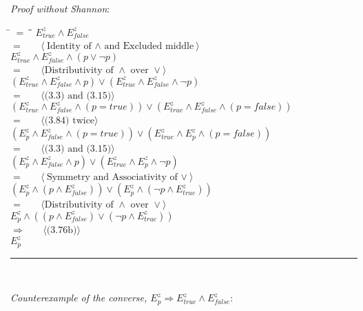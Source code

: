 \documentclass[12pt, fleqn, leqno]{article}
\newcommand{\lgap}{2pt}                             %
\newcommand{\mymathindent}{24pt}                    %
\newcommand{\impl}{\ensuremath{\Rightarrow}}        %
\newcommand{\myqed}{\rule[-.23ex]{1.2ex}{2.0ex}}
\newcommand{\myqedtab}{\hspace{384pt}}              %
\newcommand{\Gll} {\langle}                         %
\newcommand{\Ggg} {\rangle}                         %
\newcommand{\Hint}[1]     {\ \ \ $\Gll              \mbox{#1} \Ggg$ }   %
\begin{document}
\emph{Proof without Shannon}:
\begin{tabbing}
\hspace{\mymathindent} \= $= \;$ \= \myqedtab \= \kill
	\> \>  $E^{z}_{true}\land E^{z}_{false}$\\
	\> $=$  \>  \Hint{Identity of $\land$ and Excluded middle}\\[\lgap]
	\> \>   $E^{z}_{true}\land E^{z}_{false}\land(p\lor\lnot p)$\\
	\> $=$  \>  \Hint{Distributivity of $\land$ over $\lor$}\\[\lgap]
	\> \>   $(E^{z}_{true}\land E^{z}_{false}\land p)\lor(E^{z}_{true}\land E^{z}_{false}\land\lnot p)$\\
	\> $=$  \>  \Hint{(3.3) and (3.15)}\\[\lgap]
	\> \>   $(E^{z}_{true}\land E^{z}_{false}\land (p=true))\lor(E^{z}_{true}\land E^{z}_{false}\land (p=false))$\\
	\> $=$  \>  \Hint{(3.84) twice}\\[\lgap]
	\> \>   $(E^{z}_{p}\land E^{z}_{false}\land (p=true))\lor(E^{z}_{true}\land E^{z}_{p}\land (p=false))$\\
	\> $=$  \>  \Hint{(3.3) and (3.15)}\\[\lgap]
	\> \>   $(E^{z}_{p}\land E^{z}_{false}\land p)\lor(E^{z}_{true}\land E^{z}_{p}\land\lnot p)$\\
	\> $=$  \>  \Hint{Symmetry and Associativity of $\lor$}\\[\lgap]
	\> \>  $(E^{z}_{p}\land (p\land E^{z}_{false}))\lor(E^{z}_{p}\land (\lnot p\land E^{z}_{true}))$\\
	\> $=$  \>  \Hint{Distributivity of $\land$ over $\lor$}\\[\lgap]
	\> \>   $E^{z}_{p}\land ((p\land E^{z}_{false})\lor (\lnot p\land E^{z}_{true}))$\\
	\> $\impl$  \>  \Hint{(3.76b)}\\[\lgap]
	\> \>   $E^{z}_{p}$ \quad \myqed \\

\end{tabbing}

\emph{Counterexample of the converse, $E^{z}_{p} \impl E^{z}_{true}\land E^{z}_{false}$}:
\end{document}
